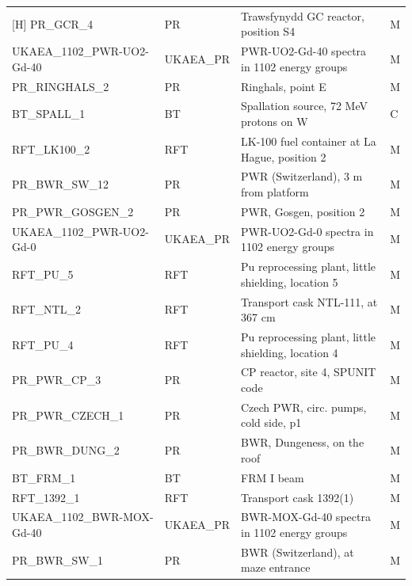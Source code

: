 \documentclass[a4paper, 12pt]{article}
\begin{document}
\begin{appendices}
\begin{longtable}{llll}[H]
PR\_GCR\_4 & PR & Trawsfynydd GC reactor, position S4  & M\\
UKAEA\_1102\_PWR-UO2-Gd-40 & UKAEA\_PR & PWR-UO2-Gd-40 spectra in 1102 energy groups & M\\
PR\_RINGHALS\_2 & PR & Ringhals, point E  & M\\
BT\_SPALL\_1 & BT & Spallation source, 72 MeV protons on W  & C\\
RFT\_LK100\_2 & RFT & LK-100 fuel container at La Hague, position 2  & M\\
PR\_BWR\_SW\_12 & PR & PWR (Switzerland), 3 m from platform  & M\\
PR\_PWR\_GOSGEN\_2 & PR & PWR, Gosgen, position 2  & M\\
UKAEA\_1102\_PWR-UO2-Gd-0 & UKAEA\_PR & PWR-UO2-Gd-0 spectra in 1102 energy groups & M\\
RFT\_PU\_5 & RFT & Pu reprocessing plant, little shielding, location 5  & M\\
RFT\_NTL\_2 & RFT & Transport cask NTL-111, at 367 cm  & M\\
RFT\_PU\_4 & RFT & Pu reprocessing plant, little shielding, location 4  & M\\
PR\_PWR\_CP\_3 & PR & CP reactor, site 4, SPUNIT code  & M\\
PR\_PWR\_CZECH\_1 & PR & Czech PWR, circ. pumps, cold side, p1  & M\\
PR\_BWR\_DUNG\_2 & PR & BWR, Dungeness, on the roof  & M\\
BT\_FRM\_1 & BT & FRM I beam  & M\\
RFT\_1392\_1 & RFT & Transport cask 1392(1)  & M\\
UKAEA\_1102\_BWR-MOX-Gd-40 & UKAEA\_PR & BWR-MOX-Gd-40 spectra in 1102 energy groups & M\\
PR\_BWR\_SW\_1 & PR & BWR (Switzerland), at maze entrance  & M
\end{longtable}


\end{appendices}
\end{document}
